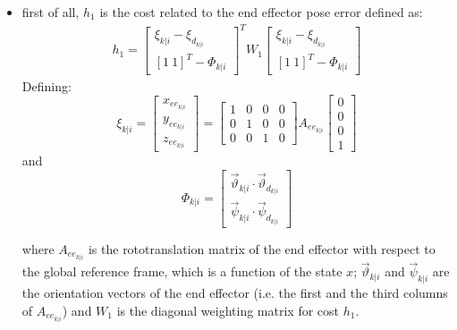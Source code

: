 \begin{itemize}

\item first of all, $h_1$ is the cost related to the end effector pose error defined as: 
\begin{equation}
\begin{split}
h_1 = \left[\begin{matrix} \xi_{k|i}-\xi_{{d}_{k|i}} \\ [1\ 1]^T-\Phi_{k|i} \end{matrix}\right]^T W_1\left[\begin{matrix} \xi_{k|i}-\xi_{{d}_{k|i}} \\ [1\ 1]^T-\Phi_{k|i}\end{matrix}\right]\textbf{}
\end{split}
\end{equation}
Defining:
\begin{equation} 
\xi_{k|i} = \left[ \begin{matrix} x_{{ee}_{k|i}} \\ y_{{ee}_{k|i}} \\ z_{{ee}_{k|i}} 
\end{matrix} \right] = \left[ \begin{matrix}
1 & 0 & 0 & 0 \\ 0 & 1 & 0 & 0 \\ 0 & 0 & 1 & 0
\end{matrix} \right]A_{{ee}_{k|i}}\left[ \begin{matrix}
0 \\ 0 \\ 0 \\ 1
\end{matrix} \right]
\end{equation} 
and
\begin{equation}
\Phi_{k|i}=\left[\begin{matrix}\vec{\vartheta}_{k|i}\cdot\vec{\vartheta}_{d_{k|i}}\\ \vec{\psi}_{k|i}\cdot\vec{\psi}_{d_{k|i}}
\end{matrix}\right] 
\end{equation}

where $A_{{ee}_{k|i}}$ is the rototranslation matrix of the end effector with respect to the global reference frame, which is a function of the state $x$;  $\vec{\vartheta}_{k|i}$ and $\vec{\psi}_{k|i}$ are the orientation vectors of the end effector (i.e. the first and the third columns of $A_{{ee}_{k|i}}$) and $W_1$ is the diagonal weighting matrix for cost $h_1$.


\end{itemize}
